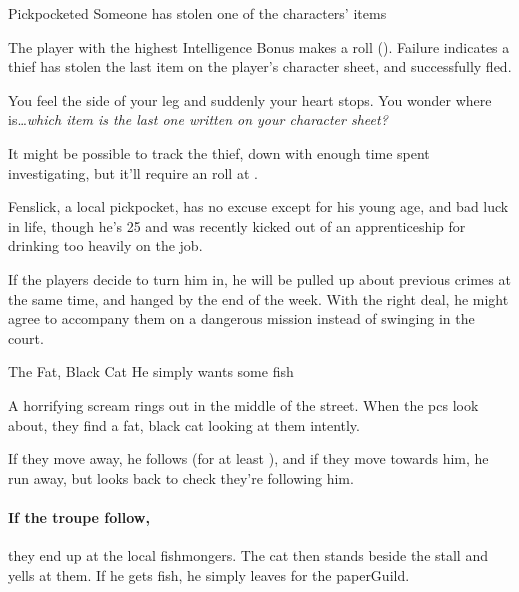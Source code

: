 \label{randommeetings}

{Pickpocketed}%
{Someone has stolen one of the characters' items}%

The player with the highest Intelligence Bonus makes a  roll (\tn[9]).
Failure indicates a thief has stolen the last item on the player's character sheet, and successfully fled.

\begin{boxtext}

  You feel the side of your leg and suddenly your heart stops.
  You wonder where is\ldots \textit{which item is the last one written on your character sheet?}

\end{boxtext}

It might be possible to track the thief, down with enough time spent investigating, but it'll require an  roll at \tn[13].

Fenslick, a local pickpocket, has no excuse except for his young age, and bad luck in life, though he's 25 and was recently kicked out of an apprenticeship for drinking too heavily on the job.

If the players decide to turn him in, he will be pulled up about previous crimes at the same time, and hanged by the end of the week.
With the right deal, he might agree to accompany them on a dangerous mission instead of swinging in the \gls{court}.


{The Fat, Black Cat}%
{He simply wants some fish}%

A horrifying scream rings out in the middle of the street.
When the \glspl{pc} look about, they find a fat, black cat looking at them intently.

If they move away, he follows (for at least ), and if they move towards him, he run away, but looks back to check they're following him.

\paragraph{If the troupe follow,}
they end up at the local fishmongers.
The cat then stands beside the stall and yells at them.
If he gets fish, he simply leaves for the \gls{paperGuild}.

